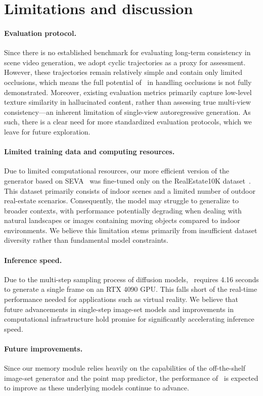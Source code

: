 \section{Limitations and discussion}

\paragraph{Evaluation protocol.}
Since there is no established benchmark for evaluating long-term consistency in scene video generation, we adopt cyclic trajectories as a proxy for assessment. However, these trajectories remain relatively simple and contain only limited occlusions, which means the full potential of \mname~in handling occlusions is not fully demonstrated. Moreover, existing evaluation metrics primarily capture low-level texture similarity in hallucinated content, rather than assessing true multi-view consistency—an inherent limitation of single-view autoregressive generation. As such, there is a clear need for more standardized evaluation protocols, which we leave for future exploration.


\paragraph{Limited training data and computing resources.} 
Due to limited computational resources, our more efficient version of the generator based on SEVA~\cite{seva} was fine-tuned only on the RealEstate10K dataset~\cite{realestate}. This dataset primarily consists of indoor scenes and a limited number of outdoor real-estate scenarios. Consequently, the model may struggle to generalize to broader contexts, with performance potentially degrading when dealing with natural landscapes or images containing moving objects compared to indoor environments. We believe this limitation stems primarily from insufficient dataset diversity rather than fundamental model constraints. 


\paragraph{Inference speed.}
Due to the multi-step sampling process of diffusion models, \mname~requires 4.16 seconds to generate a single frame on an RTX 4090 GPU. This falls short of the real-time performance needed for applications such as virtual reality. We believe that future advancements in single-step image-set models and improvements in computational infrastructure hold promise for significantly accelerating inference speed.

\paragraph{Future improvements.}
Since our memory module relies heavily on the capabilities of the off-the-shelf image-set generator and the point map predictor, the performance of \mname~is expected to improve as these underlying models continue to advance.
